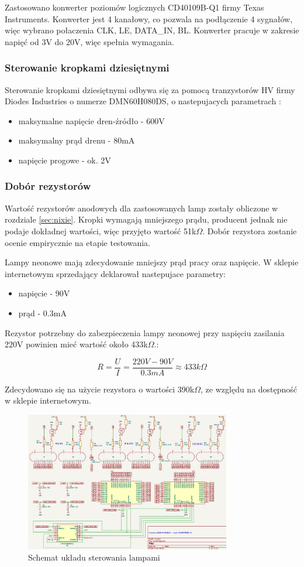 \documentclass[../../main.tex]{subfiles}
\begin{document}
Zastosowano konwerter poziomów logicznych CD40109B-Q1 firmy Texas Instruments\cite{st:konwerter}.
Konwerter jest 4 kanałowy, co pozwala na podłączenie 4 sygnałów, więc wybrano połaczenia
CLK, LE, DATA\_IN, BL. Konwerter pracuje w zakresie napięć od 3V do 20V, więc spełnia wymagania.

\subsubsection{Sterowanie kropkami dziesiętnymi}
Sterowanie kropkami dziesiętnymi odbywa się za pomocą tranzystorów HV firmy Diodes Industries o numerze DMN60H080DS, 
o nastepujacych parametrach \cite{st:rejestry}:
\begin{itemize}
    \item maksymalne napięcie dren-źródło - 600V
    \item maksymalny prąd drenu - 80mA
    \item napięcie progowe - ok. 2V
\end{itemize}

\subsubsection{Dobór rezystorów}
Wartość rezystorów anodowych dla zastosowanych lamp zostały obliczone w rozdziale \ref{sec:nixie}.
Kropki wymagają mniejszego prądu, producent jednak nie podaje dokładnej wartości, więc przyjęto wartość 51k$\Omega$.
Dobór rezystora zostanie ocenie empirycznie na etapie testowania.

Lampy neonowe mają zdecydowanie mniejszy prąd pracy oraz napięcie. W sklepie internetowym sprzedający deklarował nastepujace parametry:
\begin{itemize}
    \item napięcie - 90V
    \item prąd - 0.3mA
\end{itemize}

Rezystor potrzebny do zabezpieczenia lampy neonowej przy napięciu zasilania 220V powinien mieć wartość około 433k$\Omega$.:

\begin{equation}
    R = \frac{U}{I} = \frac{220V - 90V}{0.3mA} \approx 433k\Omega
\end{equation}

Zdecydowano się na użycie rezystora o wartości 390k$\Omega$, ze względu na dostępność w sklepie internetowym.

\begin{figure}[H]
    \centering
    \includegraphics[width=0.8\textwidth]{nixie.png}
    \caption{Schemat układu sterowania lampami}
\end{figure}
\end{document}
